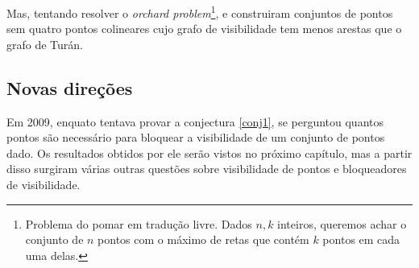 Mas, tentando resolver o \textit{orchard problem}\footnote{Problema do pomar em tradução livre. Dados $n,k$ inteiros, queremos achar o conjunto de $n$ pontos com o máximo de retas que contém $k$ pontos em cada uma delas.}, \cite{Burr1974} e \cite{10.2307/2045427} construiram conjuntos de pontos sem quatro pontos colineares cujo grafo de visibilidade tem menos arestas que o grafo de Turán.

\subsection {Novas direções}

Em 2009, enquato tentava provar a conjectura \ref{conj1}, \cite{blockers} se perguntou quantos pontos são necessário para bloquear a visibilidade de um conjunto de pontos dado. Os resultados obtidos por ele serão vistos no próximo capítulo, mas a partir disso surgiram várias outras questões sobre visibilidade de pontos e bloqueadores de visibilidade.

